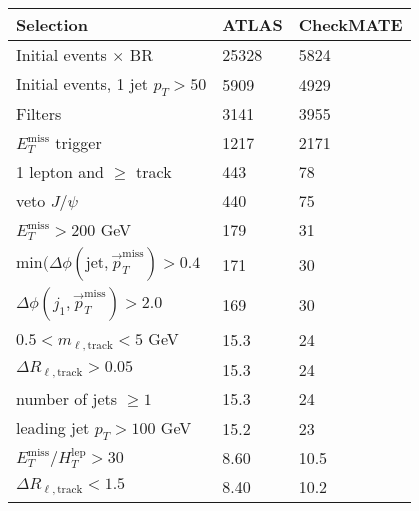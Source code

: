 \documentclass[12pt,fleqn]{article}
\begin{document}
\begin{enumerate}
\begin{table}[h!] \begin{center}
 \renewcommand*{\arraystretch}{1.2}
 \begin{tabular}{l|p{3cm}|p{3cm}} \toprule
  Selection                                                                       & ATLAS     & CheckMATE       \\ \midrule
  Initial events $\times$ BR                                                      &  25328    &   5824         \\
  Initial events, 1 jet $p_T > 50$                                                &  5909     &   4929        \\
  Filters                                                                         &  3141     &   3955   \\
  $E_T^\mathrm{miss}$ trigger                                                     &  1217     &   2171  \\
  1 lepton and $\geq$ track                                                       &   443     &    78   \\
  veto $J/\psi$                                                                   &   440     &    75 \\ 
  $E_T^\mathrm{miss} > 200$ GeV                                                   &   179     &    31 \\
  min$(\Delta\phi(\mathrm{jet}, \vec{p}_T^\mathrm{miss})>0.4$                     &   171     &    30\\   
  $\Delta\phi(j_1, \vec{p}_T^\mathrm{miss})>2.0$                                  &   169     &    30  \\
  $0.5 < m_{\ell,\mathrm{track}} < 5$ GeV                                         &   15.3    &    24  \\
  $\Delta R_{\ell,\mathrm{track}} > 0.05$                                         &   15.3    &    24  \\
  number of jets $\geq 1$                                                         &   15.3    &    24  \\
  leading jet $p_T > 100 $ GeV                                                    &   15.2    &    23  \\ 
  $E_T^\mathrm{miss}/H^{\mathrm{lep}}_T > 30$                                     &   8.60    &    10.5  \\
  $\Delta R_{\ell,\mathrm{track}} < 1.5$                                          &   8.40    &    10.2  \\

\end{tabular}
\end{center}
\end{table}
\end{enumerate}
\end{document}
